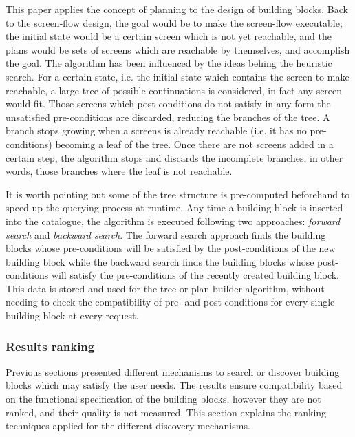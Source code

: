 This paper applies the concept of planning to the design of building blocks. Back to the screen-flow design, the goal
would be to make the screen-flow executable; the initial state would be a certain screen which is not yet reachable, 
and the plans would be sets of screens which are reachable by themselves, and accomplish the goal. 
The algorithm has been influenced by the ideas behing the heuristic search. For a certain state, i.e. the initial 
state which contains the screen to make reachable, a large tree of possible continuations is considered, in 
fact any screen would fit. Those screens which post-conditions do not satisfy in any form the unsatisfied 
pre-conditions are discarded, reducing the branches of the tree. A branch stops growing when a screens is
already reachable (i.e. it has no pre-conditions) becoming a leaf of the tree. Once there are not screens 
added in a certain step, the algorithm stops and discards the incomplete branches, in other words, 
those branches where the leaf is not reachable.

It is worth pointing out some of the tree structure is pre-computed beforehand to speed up the querying process at runtime. 
Any time a building block is inserted into the catalogue, the algorithm is executed following two approaches: 
\emph{forward search} and \emph{backward search}. The forward search approach finds the building blocks whose 
pre-conditions will be satisfied by the post-conditions of the new building block while the backward search 
finds the building blocks whose post-conditions will satisfy the pre-conditions of the recently
created building block. This data is stored and used for the tree or plan builder algorithm, without
needing to check the compatibility of pre- and post-conditions for every single building block at every 
request. 

\subsubsection{Results ranking}
\label{sssec:ranking}

Previous sections presented different mechanisms to search or discover building blocks which may satisfy the user needs.
The results ensure compatibility based on the functional specification of the building blocks, however they are not
ranked, and their quality is not measured. This section explains the ranking techniques applied for the different
discovery mechanisms.

